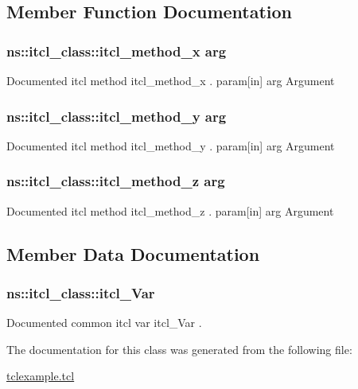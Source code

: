 \subsection{Member Function Documentation}
\hypertarget{classns_1_1itcl__class_abc59160f823f3a6ec8c292c034aedbc3}{
\subsubsection[{itcl\-\_\-method\-\_\-x}]{\setlength{\rightskip}{0pt plus 5cm}ns\-::itcl\-\_\-class\-::itcl\-\_\-method\-\_\-x {arg }
}}\label{classns_1_1itcl__class_abc59160f823f3a6ec8c292c034aedbc3}
Documented itcl method {\ttfamily itcl\-\_\-method\-\_\-x} . param\mbox{[}in\mbox{]} arg Argument \hypertarget{classns_1_1itcl__class_a092d0f8ed4796902e41fbeb1dfed82f1}{
\subsubsection[{itcl\-\_\-method\-\_\-y}]{\setlength{\rightskip}{0pt plus 5cm}ns\-::itcl\-\_\-class\-::itcl\-\_\-method\-\_\-y {arg }
}}\label{classns_1_1itcl__class_a092d0f8ed4796902e41fbeb1dfed82f1}
Documented itcl method {\ttfamily itcl\-\_\-method\-\_\-y} . param\mbox{[}in\mbox{]} arg Argument \hypertarget{classns_1_1itcl__class_a13a383c766e489814960345540106cc1}{
\subsubsection[{itcl\-\_\-method\-\_\-z}]{\setlength{\rightskip}{0pt plus 5cm}ns\-::itcl\-\_\-class\-::itcl\-\_\-method\-\_\-z {arg }
}}\label{classns_1_1itcl__class_a13a383c766e489814960345540106cc1}
Documented itcl method {\ttfamily itcl\-\_\-method\-\_\-z} . param\mbox{[}in\mbox{]} arg Argument 

\subsection{Member Data Documentation}
\hypertarget{classns_1_1itcl__class_a8df46696ce554fed04d170932260fbb8}{
\subsubsection[{itcl\-\_\-\-Var}]{\setlength{\rightskip}{0pt plus 5cm}ns\-::itcl\-\_\-class\-::itcl\-\_\-\-Var\hspace{0.3cm}{\ttfamily [static]}}}\label{classns_1_1itcl__class_a8df46696ce554fed04d170932260fbb8}
Documented common itcl var {\ttfamily itcl\-\_\-\-Var} . 

The documentation for this class was generated from the following file\-:\begin{DoxyCompactItemize}
\item 
\hyperlink{tclexample_8tcl}{tclexample.\-tcl}\end{DoxyCompactItemize}
